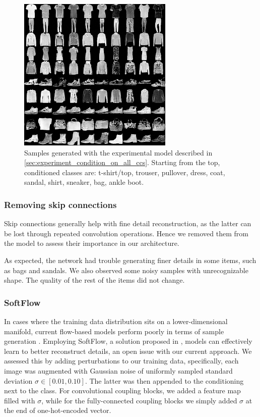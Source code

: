 \documentclass[final]{cvpr}
\begin{document}
\begin{figure}[t]
	\begin{center}
		\includegraphics[width=0.8\linewidth]{./figs/fashion_mnist/final_model_samples.png}
	\end{center}
	\caption{Samples generated with the experimental model described in \ref{sec:experiment_condition_on_all_ccs}. Starting from the top, conditioned classes are: t-shirt/top, trouser, pullover, dress, coat, sandal, shirt, sneaker, bag, ankle boot.}
	\label{fig:fashionmnist_final_model_samples}
\end{figure}

\subsubsection{Removing skip connections}
Skip connections generally help with fine detail reconstruction, as the latter can be lost through repeated convolution operations. Hence we removed them from the model to assess their importance in our architecture.

As expected, the network had trouble generating finer details in some items, such as bags and sandals. We also observed some noisy samples with unrecognizable shape. The quality of the rest of the items did not change.

\subsubsection{SoftFlow}\label{sec:experiment_softflow}
In cases where the training data distribution sits on a lower-dimensional manifold, current flow-based models perform poorly in terms of sample generation \cite{softflow}. Employing SoftFlow, a solution proposed in \cite{softflow}, models can effectively learn to better reconstruct details, an open issue with our current approach. We assessed this by adding perturbations to our training data, specifically, each image was augmented with Gaussian noise of uniformly sampled standard deviation $\sigma \in [0.01, 0.10]$. The latter was then appended to the conditioning next to the class. For convolutional coupling blocks, we added a feature map filled with $\sigma$, while for the fully-connected coupling blocks we simply added $\sigma$ at the end of one-hot-encoded vector.
\end{document}
